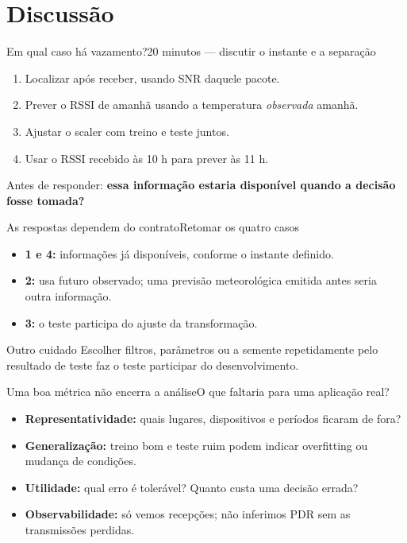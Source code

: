 \documentclass[aspectratio=169,10pt]{beamer}
\begin{document}
\section{Discussão}
\begin{frame}{Em qual caso há vazamento?}{20 minutos — discutir o instante e a separação}
\begin{enumerate}
\item Localizar após receber, usando SNR daquele pacote.
\item Prever o RSSI de amanhã usando a temperatura \emph{observada} amanhã.
\item Ajustar o scaler com treino e teste juntos.
\item Usar o RSSI recebido às 10 h para prever às 11 h.
\end{enumerate}
\vspace{4mm}
Antes de responder: \textbf{essa informação estaria disponível quando a decisão fosse tomada?}
\end{frame}

\begin{frame}{As respostas dependem do contrato}{Retomar os quatro casos}
\begin{itemize}
\item \textbf{1 e 4:} informações já disponíveis, conforme o instante definido.
\item \textbf{2:} usa futuro observado; uma previsão meteorológica emitida antes seria outra informação.
\item \textbf{3:} o teste participa do ajuste da transformação.
\end{itemize}
\begin{block}{Outro cuidado}
Escolher filtros, parâmetros ou a semente repetidamente pelo resultado de teste
faz o teste participar do desenvolvimento.
\end{block}
\end{frame}

\begin{frame}{Uma boa métrica não encerra a análise}{O que faltaria para uma aplicação real?}
\begin{itemize}
\item \textbf{Representatividade:} quais lugares, dispositivos e períodos ficaram de fora?
\item \textbf{Generalização:} treino bom e teste ruim podem indicar overfitting ou mudança de condições.
\item \textbf{Utilidade:} qual erro é tolerável? Quanto custa uma decisão errada?
\item \textbf{Observabilidade:} só vemos recepções; não inferimos PDR sem as transmissões perdidas.
\end{itemize}
\end{frame}
\end{document}
